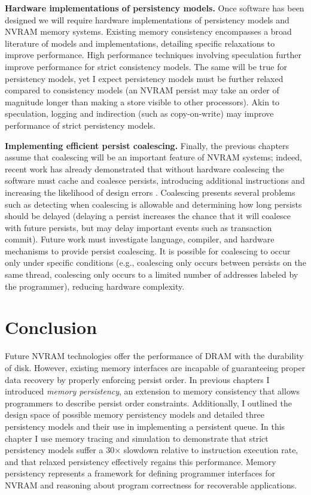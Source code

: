 \textbf{Hardware implementations of persistency models.}
Once software has been designed we will require hardware implementations of persistency models and NVRAM memory systems.
Existing memory consistency encompasses a broad literature of models and implementations, detailing specific relaxations to improve performance.
High performance techniques involving speculation further improve performance for strict consistency models.
The same will be true for persistency models, yet I expect persistency models must be further relaxed compared to consistency models (an NVRAM persist may take an order of magnitude longer than making a store visible to other processors).
Akin to speculation, logging and indirection (such as copy-on-write) may improve performance of strict persistency models.

\textbf{Implementing efficient persist coalescing.}
Finally, the previous chapters assume that coalescing will be an important feature of NVRAM systems; indeed, recent work has already demonstrated that without hardware coalescing the software must cache and coalesce persists, introducing additional instructions and increasing the likelihood of design errors \cite{ConditNightingale09,FangHsiao11}.
Coalescing presents several problems such as detecting when coalescing is allowable and determining how long persists should be delayed (delaying a persist increases the chance that it will coalesce with future persists, but may delay important events such as transaction commit).
Future work must investigate language, compiler, and hardware mechanisms to provide persist coalescing.
It is possible for coalescing to occur only under specific conditions (e.g., coalescing only occurs between persists on the same thread, coalescing only occurs to a limited number of addresses labeled by the programmer), reducing hardware complexity.

\section{Conclusion}
\label{sec:PersistencyEval:Conclusion}

Future NVRAM technologies offer the performance of DRAM with the durability of disk.
However, existing memory interfaces are incapable of guaranteeing proper data recovery by properly enforcing persist order.
In previous chapters I introduced \emph{memory persistency}, an extension to memory consistency that allows programmers to describe persist order constraints.
Additionally, I outlined the design space of possible memory persistency models and detailed three persistency models and their use in implementing a persistent queue.
In this chapter I use memory tracing and simulation to demonstrate that strict persistency models suffer a 30$\times$ slowdown relative to instruction execution rate, and that relaxed persistency effectively regains this performance.
Memory persistency represents a framework for defining programmer interfaces for NVRAM and reasoning about program correctness for recoverable applications.
